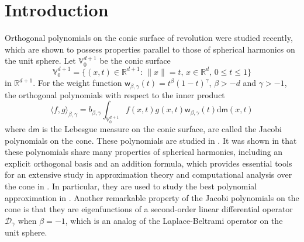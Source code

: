 \documentclass{amsart}
\theoremstyle{remark}
\def\la{{\langle}}
\def\ra{{\rangle}}
\def\d{\mathrm{d}}
\def\sm{{\mathsf m}}
\def\sw{{\mathsf w}}
\def\b{{\beta}}
\def\g{{\gamma}}
\def\la{{\langle}}
\def\ra{{\rangle}}
\def\CD{{\mathcal D}}
\def\RR{{\mathbb R}}
\def\VV{{\mathbb V}}
\begin{document}
\maketitle

\section{Introduction}
\setcounter{equation}{0}

Orthogonal polynomials on the conic surface of revolution were studied recently, which are shown
to possess properties parallel to those of spherical harmonics on the unit sphere. 
Let $\VV_0^{d+1}$ be the conic surface
$$
  \VV_0^{d+1} = \{(x,t) \in \RR^{d+1}: \, \|x\| = t, \, x \in \RR^d, \, 0 \le t \le 1\}
$$
in $\RR^{d+1}$. For the weight function $\sw_{\b,\g}(t) = t^\b(1-t)^\g$, $\b > -d$ and $\g > -1$, the orthogonal
polynomials with respect to the inner product
$$
  \la f,g\ra_{\b,\g} = b_{\b,\g} \int_{\VV_0^{d+1}} f(x,t) g(x,t) \sw_{\b,\g}(t) \d \sm (x,t)
$$
where $\d \sm$ is the Lebesgue measure on the conic surface, are called the Jacobi polynomials on the cone. These polynomials are studied in \cite{OX20, X20, X21a, X21, X23}.
It was shown in \cite{X20} that these polynomials share many
properties of spherical harmonics, including an explicit orthogonal basis and an addition formula, which provides
essential tools for an extensive study in approximation theory and computational analysis over the cone in
\cite{X21}. In particular, they are used to study the best polynomial approximation in \cite{GX}. Another remarkable 
property of the Jacobi polynomials on the cone is that they are eigenfunctions of a second-order linear differential 
operator $\CD_\g$ when $\b = -1$, which is an analog of the Laplace-Beltrami operator on the unit sphere. 
\end{document}
